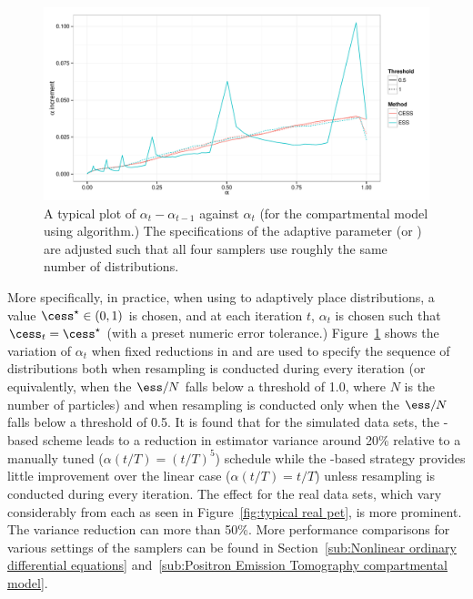\begin{figure}[t]
  \includegraphics[width=\linewidth]{fig/Adaptive_Dist}
  \caption{A typical plot of $\alpha_t - \alpha_{t-1}$ against $\alpha_t$ (for
    the \pet compartmental model using \smc[2] algorithm.) The specifications of
    the adaptive parameter (\ess or \cess) are adjusted such that all four
    samplers use roughly the same number of distributions.}
  \label{fig:adaptive_alpha}
\end{figure}

More specifically, in practice, when using \cess to adaptively place
distributions, a value $\cess^\star \in (0, 1)$ is chosen, and at each
iteration $t$, $\alpha_t$ is chosen such that $\cess_t = \cess^\star$ (with a
preset numeric error tolerance.) Figure~\ref{fig:adaptive_alpha} shows the
variation of $\alpha_t$ when fixed reductions in \ess and \cess are used to
specify the sequence of distributions both when resampling is conducted during
every iteration (or equivalently, when the $\ess/N$ falls below a threshold of
1.0, where $N$ is the number of particles) and when resampling is conducted
only when the $\ess/N$ falls below a threshold of 0.5. It is found that for
the simulated \pet data sets, the \cess-based scheme leads to a reduction in
estimator variance around 20\% relative to a manually tuned ($\alpha(t/T) =
(t/T)^5$) schedule while the \ess-based strategy provides little improvement
over the linear case ($\alpha(t/T) = t/T$) unless resampling is conducted
during every iteration. The effect for the real data sets, which vary
considerably from each as seen in Figure~\ref{fig:typical real pet}, is more
prominent. The variance reduction can more than 50\%. More performance
comparisons for various settings of the samplers can be found in
Section~\ref{sub:Nonlinear ordinary differential equations}
and~\ref{sub:Positron Emission Tomography compartmental model}.

